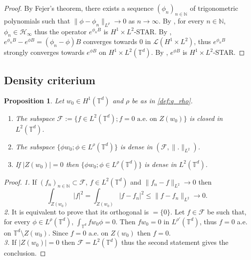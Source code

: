 \documentclass[a4paper]{article}
\theoremstyle{plain}
\newtheorem{proposition}[theorem]{Proposition}
\newcommand{\T}{\mathbb{T}}
\begin{document}
\begin{proof}
By Fejer's theorem, there exists a sequence $(\phi_n)_{n\in\mathbb{N}}$ of trigonometric polynomials such that $\|\phi-\phi_n \|_{L^{\rho}} \to 0$ as $n \to \infty$. By , for every $n \in \mathbb{N}$, $\phi_n \in \mathcal{H}_{\infty}$ thus the operator $e^{\phi_n B}$ is $H^1 \times L^2$-STAR. By ,
$e^{\phi_n B}-e^{\phi B} = (\phi_n-\phi)B$ converges towards $0$ in  $\mathcal{L}(H^1 \times L^2)$, thus $e^{\phi_n B}$ strongly converges towards $e^{\phi B}$ on $H^1 \times L^2(\T^d)$. By , $e^{\phi B}$ is $H^1 \times L^2$-STAR.
\end{proof}

\subsection{Density criterium}
\label{subsec:DenseCrit}


\begin{proposition} \label{Lem:dense}
Let $w_0 \in H^1(\T^d)$ and $\rho$ be as in \eqref{def:q_rho}.
\begin{enumerate}[topsep=0cm, parsep=0cm, itemsep=0cm]
%
 \item The subspace $\mathcal{F}:=\{f \in L^2(\T^d);f=0 \text{ a.e. on } Z(w_0) \}$
 is closed in $L^2(\T^d)$.
 \item The subspace $\{\phi w_0 ; \phi \in L^{\rho}(\T^d) \}$ is dense in $(\mathcal{F},\|.\|_{L^2})$. 
 \item If $|Z(w_0)|=0$ then $\{\phi w_0 ; \phi \in L^{\rho}(\T^d) \}$ is dense in $L^2(\T^d)$.
\end{enumerate}  
\end{proposition}  

\begin{proof}
\emph{1.} If $(f_n)_{n \in \mathbb{N}} \subset \mathcal{F}$, $f \in L^2(\T^d)$ and $\|f_n-f\|_{L^2} \to 0$ then   
$$\int_{Z(w_0)} |f|^2 = \int_{Z(w_0)} |f-f_n|^2 \leq \|f-f_n\|_{L^2} \to 0.$$
\noindent \emph{2.} It is equivalent to prove that its orthogonal is $=\{0\}$. Let $f \in \mathcal{F}$ be such that, for every $\phi \in L^{\rho}(\T^d)$,
$\int_{\T^d} f w_0 \phi=0$. Then $fw_0=0$ in $L^{\rho'}(\T^d)$, thus $f=0$ a.e. on $\T^d \setminus Z(w_0)$. Since $f=0$ a.e. on $Z(w_0)$
 then $f=0$. 
 \\
\noindent \emph{3.} If $|Z(w_0)|=0$ then $\mathcal{F}=L^2(\T^d)$ thus the second statement gives the conclusion.
\end{proof}
\end{document}
